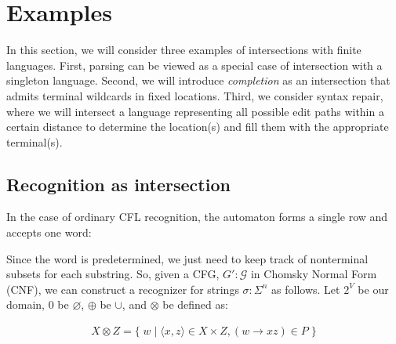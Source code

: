 \documentclass[popl.tex]{subfiles}
\begin{document}
\clearpage\section{Examples}

In this section, we will consider three examples of intersections with finite languages. First, parsing can be viewed as a special case of intersection with a singleton language. Second, we will introduce \textit{completion} as an intersection that admits terminal wildcards in fixed locations. Third, we consider syntax repair, where we will intersect a language representing all possible edit paths within a certain distance to determine the location(s) and fill them with the appropriate terminal(s).

\subsection{Recognition as intersection}

In the case of ordinary CFL recognition, the automaton forms a single row and accepts one word:

\begin{figure}[H]
\end{figure}

Since the word is predetermined, we just need to keep track of nonterminal subsets for each substring. So, given a CFG, $G' : \mathcal{G}$ in Chomsky Normal Form (CNF), we can construct a recognizer for strings $\sigma: \Sigma^n$ as follows. Let $2^V$ be our domain, $0$ be $\varnothing$, $\oplus$ be $\cup$, and $\otimes$ be defined as:\vspace{-10pt}

\begin{align}
  X \otimes Z = \big\{\;w \mid \langle x, z\rangle \in X \times Z, (w\rightarrow xz) \in P\;\big\}
\end{align}
\end{document}
